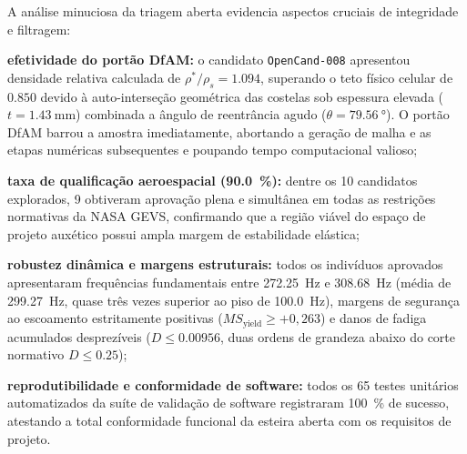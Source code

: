 A análise minuciosa da triagem aberta evidencia aspectos cruciais de integridade e filtragem:
\begin{alineas}
  \item \textbf{efetividade do portão DfAM:} o candidato \texttt{OpenCand-008} apresentou densidade relativa calculada de $\rho^* / \rho_s = \num{1.094}$, superando o teto físico celular de $\num{0.850}$ devido à auto-interseção geométrica das costelas sob espessura elevada ($t = \SI{1.43}{\milli\metre}$) combinada a ângulo de reentrância agudo ($\theta = \SI{79.56}{\degree}$). O portão DfAM barrou a amostra imediatamente, abortando a geração de malha e as etapas numéricas subsequentes e poupando tempo computacional valioso;
  \item \textbf{taxa de qualificação aeroespacial (\SI{90.0}{\percent}):} dentre os 10 candidatos explorados, 9 obtiveram aprovação plena e simultânea em todas as restrições normativas da NASA GEVS, confirmando que a região viável do espaço de projeto auxético possui ampla margem de estabilidade elástica;
  \item \textbf{robustez dinâmica e margens estruturais:} todos os indivíduos aprovados apresentaram frequências fundamentais entre \SI{272.25}{\hertz} e \SI{308.68}{\hertz} (média de \SI{299.27}{\hertz}, quase três vezes superior ao piso de \SI{100.0}{\hertz}), margens de segurança ao escoamento estritamente positivas ($MS_{\text{yield}} \ge +0{,}263$) e danos de fadiga acumulados desprezíveis ($D \le \num{0.00956}$, duas ordens de grandeza abaixo do corte normativo $D \le \num{0.25}$);
  \item \textbf{reprodutibilidade e conformidade de software:} todos os 65 testes unitários automatizados da suíte de validação de software registraram \SI{100}{\percent} de sucesso, atestando a total conformidade funcional da esteira aberta com os requisitos de projeto.
\end{alineas}

